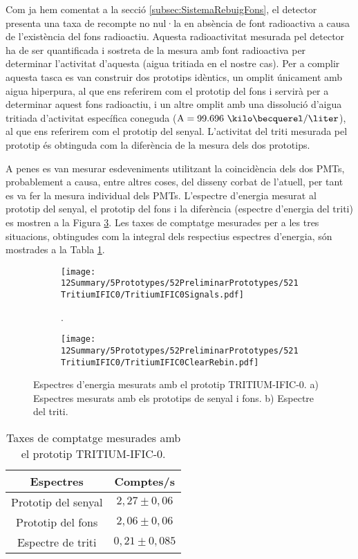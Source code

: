Com ja hem comentat a la secció \ref{subsec:SistemaRebuigFons}, el detector presenta una taxa de recompte no nul·la en absència de font radioactiva a causa de l'existència del fons radioactiu. Aquesta radioactivitat mesurada pel detector ha de ser quantificada i sostreta de la mesura amb font radioactiva per determinar l'activitat d'aquesta (aigua tritiada en el nostre cas). Per a complir aquesta tasca es van construir dos prototips idèntics, un omplit únicament amb aigua hiperpura, al que ens referirem com el prototip del fons i servirà per a determinar aquest fons radioactiu, i un altre omplit amb una dissolució d'aigua tritiada d'activitat específica coneguda ($\text{A}=99.696~\kilo\becquerel/\liter$), al que ens referirem com el prototip del senyal. L'activitat del triti mesurada pel prototip és obtinguda com la diferència de la mesura dels dos prototips.

A penes es van mesurar esdeveniments utilitzant la coincidència dels dos PMTs, probablement a causa, entre altres coses, del disseny corbat de l'atuell, per tant es va fer la mesura individual dels PMTs. L'espectre d'energia mesurat al prototip del senyal, el prototip del fons i la diferència (espectre d'energia del triti) es mostren a la Figura \ref{fig:EspectresEnergeticsTritiumIFIC0}. Les taxes de comptatge mesurades per a les tres situacions, obtingudes com la integral dels respectius espectres d'energia, són mostrades a la Tabla \ref{tab:ContesPerSegonTRITIUMIFIC0}. 

\begin{figure}
\centering
    \begin{subfigure}[b]{1\textwidth}
    \centering
    \texttt{[image: 12Summary/5Prototypes/52PreliminarPrototypes/521TritiumIFIC0/TritiumIFIC0Signals.pdf]}  
    \caption{.\label{subfig:EspectreSenyalFonsTritiumIFIC0}}
    \end{subfigure}
    \hfill
    \begin{subfigure}[b]{1\textwidth}
    \centering
    \texttt{[image: 12Summary/5Prototypes/52PreliminarPrototypes/521TritiumIFIC0/TritiumIFIC0ClearRebin.pdf]}  
    \caption{\label{subfig:EspectreTritiTritiumIFIC0}}
    \end{subfigure}
 \caption{Espectres d'energia mesurats amb el prototip TRITIUM-IFIC-0. a) Espectres mesurats amb els prototips de senyal i fons. b) Espectre del triti.}
 \label{fig:EspectresEnergeticsTritiumIFIC0}
\end{figure}

\begin{table}[htbp]
\centering{}%
\begin{tabular}{cc}
\toprule 
Espectres & Comptes/s\tabularnewline
\midrule
\midrule 
Prototip del senyal & $2,27 \pm 0,06$ \tabularnewline
Prototip del fons & $2,06 \pm 0,06$ \tabularnewline  
Espectre de triti & $0,21 \pm 0,085$ \tabularnewline
\bottomrule
\end{tabular}
\caption{Taxes de comptatge mesurades amb el prototip TRITIUM-IFIC-0.}
\label{tab:ContesPerSegonTRITIUMIFIC0}
\end{table}


